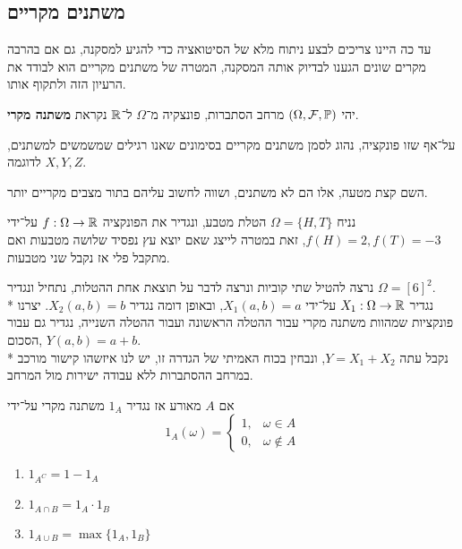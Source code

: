 \subsection{משתנים מקריים}
עד כה היינו צריכים לבצע ניתוח מלא של הסיטואציה כדי להגיע למסקנה, גם אם בהרבה מקרים שונים הגענו לבדיוק אותה המסקנה, המטרה של משתנים מקריים הוא לבודד את הרעיון הזה ולתקוף אותו.
\begin{definition}
	יהי $(\Omega, \mathcal{F}, \mathbb{P})$ מרחב הסתברות, פונצקיה מ־$\Omega$ ל־$\mathbb{R}$ נקראת \textbf{משתנה מקרי}.
\end{definition}
\begin{notation}
	על־אף שזו פונקציה, נהוג לסמן משתנים מקריים בסימונים שאנו רגילים שמשמשים למשתנים, לדוגמה $X, Y, Z$.
\end{notation}
\begin{remark}
	השם קצת מטעה, אלו הם לא משתנים, ושווה לחשוב עליהם בתור מצבים מקריים יותר.
\end{remark}
\begin{example}
	נניח $\Omega = \{H, T\}$ הטלת מטבע, ונגדיר את הפונקציה $f : \Omega \to \mathbb{R}$ על־ידי $f(H) = 2, f(T) = -3$,
	זאת במטרה לייצג שאם יוצא עץ נפסיד שלושה מטבעות ואם מתקבל פלי אז נקבל שני מטבעות.
\end{example}
\begin{example}
	נרצה להטיל שתי קוביות ונרצה לדבר על תוצאת אחת ההטלות, נתחיל ונגדיר $\Omega = {[6]}^2$. \\*
	נגדיר $X_1 : \Omega \to \mathbb{R}$ על־ידי $X_1(a, b) = a$, ובאופן דומה נגדיר $X_2(a, b) = b$.
	יצרנו פונקציות שמהוות משתנה מקרי עבור ההטלה הראשונה ועבור ההטלה השנייה, נגדיר גם עבור הסכום, $Y(a, b) = a + b$. \\*
	נקבל עתה $Y = X_1 + X_2$, ונבחין בכוח האמיתי של הגדרה זו, יש לנו איזשהו קישור מורכב במרחב ההסתברות ללא עבודה ישירות מול המרחב.
\end{example}
\begin{definition}
	אם $A$ מאורע אז נגדיר $1_A$ משתנה מקרי על־ידי
	\[
		1_A(\omega) = \begin{cases}
			1, & \omega \in A \\
			0, & \omega \notin A
		\end{cases}
	\]
\end{definition}
\begin{proposition}
	\begin{enumerate}
		\item $1_{A^C} = 1 - 1_A$
		\item $1_{A \cap B} = 1_A \cdot 1_B$
		\item $1_{A \cup B} = \max\{1_A, 1_B\}$
	\end{enumerate}
\end{proposition}
